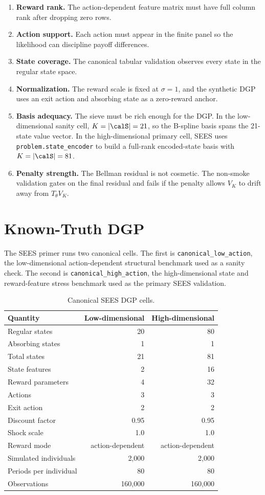 \documentclass[10pt]{article}
\begin{document}
\begin{enumerate}
\item \textbf{Reward rank.} The action-dependent feature matrix must have full
column rank after dropping zero rows.
\item \textbf{Action support.} Each action must appear in the finite panel so
the likelihood can discipline payoff differences.
\item \textbf{State coverage.} The canonical tabular validation observes every
state in the regular state space.
\item \textbf{Normalization.} The reward scale is fixed at \(\sigma=1\), and
the synthetic DGP uses an exit action and absorbing state as a zero-reward
anchor.
\item \textbf{Basis adequacy.} The sieve must be rich enough for the DGP. In
the low-dimensional sanity cell, \(K=|\calS|=21\), so the B-spline basis spans
the 21-state value vector. In the high-dimensional primary cell, SEES uses
\texttt{problem.state\_encoder} to build a full-rank encoded-state basis with
\(K=|\calS|=81\).
\item \textbf{Penalty strength.} The Bellman residual is not cosmetic. The
non-smoke validation gates on the final residual and fails if the penalty
allows \(V_K\) to drift away from \(T_\theta V_K\).
\end{enumerate}

\section{Known-Truth DGP}

The SEES primer runs two canonical cells. The first is
\texttt{canonical\_low\_action}, the low-dimensional action-dependent
structural benchmark used as a sanity check. The second is
\texttt{canonical\_high\_action}, the high-dimensional state and reward-feature
stress benchmark used as the primary SEES validation.

\begin{table}[H]
\centering\small
\caption{Canonical SEES DGP cells.}
\begin{tabular}{lrr}
\toprule
Quantity & Low-dimensional & High-dimensional \\
\midrule
Regular states & 20 & 80 \\
Absorbing states & 1 & 1 \\
Total states & 21 & 81 \\
State features & 2 & 16 \\
Reward parameters & 4 & 32 \\
Actions & 3 & 3 \\
Exit action & 2 & 2 \\
Discount factor & 0.95 & 0.95 \\
Shock scale & 1.0 & 1.0 \\
Reward mode & action-dependent & action-dependent \\
Simulated individuals & 2,000 & 2,000 \\
Periods per individual & 80 & 80 \\
Observations & 160,000 & 160,000 \\
\bottomrule
\end{tabular}
\end{table}
\end{document}
